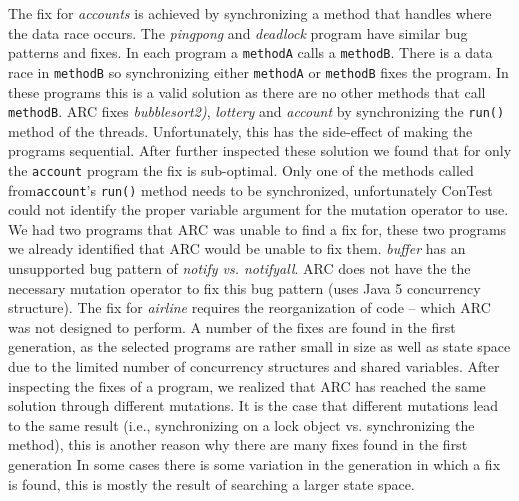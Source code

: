 
The fix for \textit{accounts} is achieved by synchronizing a method that
handles where the data race occurs.  The \textit{pingpong} and
\textit{deadlock} program have similar bug patterns and fixes.  In each program
a \texttt{methodA} calls a \texttt{methodB}.  There is a data race in
\texttt{methodB} so synchronizing either \texttt{methodA} or \texttt{methodB}
fixes the program.  In these programs this is a valid solution as there are no
other methods that call \texttt{methodB}.  ARC fixes \textit{bubblesort2)},
\textit{lottery} and \textit{account} by synchronizing the \texttt{run()}
method of the threads.  Unfortunately, this has the side-effect of making the
programs sequential.  After further inspected these solution we found that for
only the \texttt{account} program the fix is sub-optimal.  Only one of the
methods called from\texttt{account}'s  \texttt{run()} method  needs to be
synchronized, unfortunately ConTest could not identify the proper variable
argument for the mutation operator to use.  We had two programs that ARC was
unable to find a fix for, these two programs we already identified that ARC
would be unable to fix them. \textit{buffer} has an unsupported bug pattern of
\textit{notify vs. notifyall}. ARC does not have the the necessary mutation
operator to fix this bug pattern (uses Java 5 concurrency structure). The fix
for \textit{airline} requires the reorganization of code -- which ARC was not
designed to perform.  A number of the fixes are found in the first generation,
as the selected programs are rather small in size as well as state space due to
the limited number of concurrency structures and shared variables.  After
inspecting the fixes of a program, we realized that ARC has reached the same
solution through different mutations. It is the case that different mutations
lead to the same result (i.e., synchronizing on a lock object vs. synchronizing
the method), this is another reason why there are many fixes found in the first
generation  In  some cases there is some variation in the generation in which a
fix is found, this is mostly the result of searching a larger state space.
